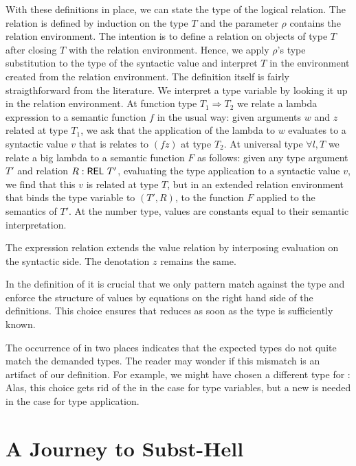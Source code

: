 \documentclass[acmsmall,anonymous,review,screen]{acmart}
\begin{document}
With these definitions in place, we can state the type of the logical relation.
\LogicalMCVType
The relation is defined by induction on the type $T$ and the parameter
$\rho$ contains the relation environment. The intention is to define a
relation on objects of type $T$ after closing $T$ with the relation
environment. Hence, we apply $\rho$'s type substitution to the type of
the syntactic value and interpret $T$ in the environment created from
the relation environment.
\LogicalMCVBody
The definition itself is fairly straigthforward from the literature.
We interpret a type variable by looking it up in the relation
environment.
At function type $T_1 \Rightarrow T_2$ we relate a lambda expression
to a semantic function $f$ in
the usual way: given arguments $w$ and $z$ related at type $T_1$, we ask that the
application of the lambda to $w$ evaluates to a syntactic value $v$ that is
relates to $(f z)$ at type $T_2$.
At universal type $\forall l, T$ we relate a big lambda to a semantic
function $F$ as follows: given any type argument $T'$ and relation $R :
\AREL\ T'$, evaluating the type application to a syntactic value $v$,
we find that this $v$ is related at type $T$, but in an extended
relation environment that binds the type variable to $(T', R)$, to the
function $F$ applied to the semantics of $T'$.
At the number type, values are constants equal to their semantic
interpretation. 

The expression relation extends the value relation by interposing
evaluation on the syntactic side. The denotation $z$ remains the
same. 
\LogicalMCE

In the definition of {\AV} it is crucial that we only pattern match
against the type and enforce the structure of values by equations on
the right hand side of the definitions. This choice ensures that {\AV}
reduces as soon as the type is sufficiently known.

The occurrence of {\Asubst} in two places indicates that the expected types do not quite
match the demanded types. The reader may wonder if this mismatch is an
artifact of our definition. For example, we might have chosen a
different type for {\AV}:
\LogicalVariationMCVType
Alas, this choice gets rid of the {\Asubst} in the case for type
variables, but a new {\Asubst} is needed in the case for type
application.

\section{A Journey to Subst-Hell}
\label{sec:subst-hell}
\end{document}
